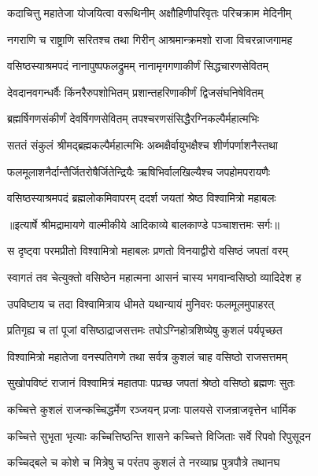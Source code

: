\twolineshloka
{कदाचित्तु महातेजा योजयित्वा वरूथिनीम्}
{अक्षौहिणीपरिवृतः परिचक्राम मेदिनीम्} %

\twolineshloka
{नगराणि च राष्ट्राणि सरितश्च तथा गिरीन्}
{आश्रमान्क्रमशो राजा विचरन्नाजगामह} %

\twolineshloka
{वसिष्ठस्याश्रमपदं नानापुष्पफलद्रुमम्}
{नानामृगगणाकीर्णं सिद्धचारणसेवितम्} %

\twolineshloka
{देवदानवगन्धर्वैः किंनरैरुपशोभितम्}
{प्रशान्तहरिणाकीर्णं द्विजसंघनिषेवितम्} %

\twolineshloka
{ब्रह्मर्षिगणसंकीर्णं देवर्षिगणसेवितम्}
{तपश्चरणसंसिद्धैरग्निकल्पैर्महात्मभिः} %

\twolineshloka
{सततं संकुलं श्रीमद्ब्रह्मकल्पैर्महात्मभिः}
{अब्भक्षैर्वायुभक्षैश्च शीर्णपर्णाशनैस्तथा} %

\twolineshloka
{फलमूलाशनैर्दान्तैर्जितरोषैर्जितेन्द्रियैः}
{ऋषिभिर्वालखिल्यैश्च जपहोमपरायणैः} %

\twolineshloka
{वसिष्ठस्याश्रमपदं ब्रह्मलोकमिवापरम्}
{ददर्श जयतां श्रेष्ठ विश्वामित्रो महाबलः} %


{॥इत्यार्षे श्रीमद्रामायणे वाल्मीकीये आदिकाव्ये बालकाण्डे पञ्चाशत्तमः सर्गः॥}


\twolineshloka
{स दृष्ट्वा परमप्रीतो विश्वामित्रो महाबलः}
{प्रणतो विनयाद्वीरो वसिष्ठं जपतां वरम्} %

\twolineshloka
{स्वागतं तव चेत्युक्तो वसिष्ठेन महात्मना}
{आसनं चास्य भगवान्वसिष्ठो व्यादिदेश ह} %

\twolineshloka
{उपविष्टाय च तदा विश्वामित्राय धीमते}
{यथान्यायं मुनिवरः फलमूलमुपाहरत्} %

\twolineshloka
{प्रतिगृह्य च तां पूजां वसिष्ठाद्राजसत्तमः}
{तपोऽग्निहोत्रशिष्येषु कुशलं पर्यपृच्छत} %

\twolineshloka
{विश्वामित्रो महातेजा वनस्पतिगणे तथा}
{सर्वत्र कुशलं चाह वसिष्ठो राजसत्तमम्} %

\twolineshloka
{सुखोपविष्टं राजानं विश्वामित्रं महातपाः}
{पप्रच्छ जपतां श्रेष्ठो वसिष्ठो ब्रह्मणः सुतः} %

\twolineshloka
{कच्चित्ते कुशलं राजन्कच्चिद्धर्मेण रञ्जयन्}
{प्रजाः पालयसे राजन्राजवृत्तेन धार्मिक} %

\twolineshloka
{कच्चित्ते सुभृता भृत्याः कच्चित्तिष्ठन्ति शासने}
{कच्चित्ते विजिताः सर्वे रिपवो रिपुसूदन} %

\twolineshloka
{कच्चिद्बले च कोशे च मित्रेषु च परंतप}
{कुशलं ते नरव्याघ्र पुत्रपौत्रे तथानघ} %

